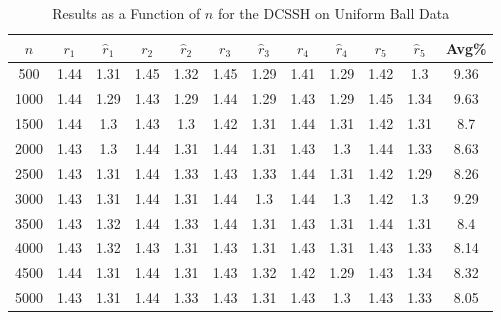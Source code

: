 \documentclass[11pt,twoside]{report}
\theoremstyle{definition}
\numberwithin{theorem}{section}
\numberwithin{definition}{section}
\numberwithin{lemma}{section}
\numberwithin{proposition}{section}
\numberwithin{equation}{section}
\numberwithin{figure}{section}
\begin{document}
\begin{appendices}
    \begin{table}[ht]
        \centering
        \begin{tabular}{|c||cc||cc||cc||cc||cc||c|} \hline
            $n$&$r_1$&$\hat{r}_1$&$r_2$&$\hat{r}_2$&$r_3$&$\hat{r}_3$&$r_4$&$\hat{r}_4$&$r_5$&$\hat{r}_5$&Avg\% \\ \hline
            500&1.44&1.31&1.45&1.32&1.45&1.29&1.41&1.29&1.42&1.3&9.36 \\
            1000&1.44&1.29&1.43&1.29&1.44&1.29&1.43&1.29&1.45&1.34&9.63 \\
            1500&1.44&1.3&1.43&1.3&1.42&1.31&1.44&1.31&1.42&1.31&8.7 \\
            2000&1.43&1.3&1.44&1.31&1.44&1.31&1.43&1.3&1.44&1.33&8.63 \\
            2500&1.43&1.31&1.44&1.33&1.43&1.33&1.44&1.31&1.42&1.29&8.26 \\
            3000&1.43&1.31&1.44&1.31&1.44&1.3&1.44&1.3&1.42&1.3&9.29 \\
            3500&1.43&1.32&1.44&1.33&1.44&1.31&1.43&1.31&1.44&1.31&8.4 \\
            4000&1.43&1.32&1.43&1.31&1.43&1.31&1.43&1.31&1.43&1.33&8.14 \\
            4500&1.44&1.31&1.44&1.31&1.43&1.32&1.42&1.29&1.43&1.34&8.32 \\
            5000&1.43&1.31&1.44&1.33&1.43&1.31&1.43&1.3&1.43&1.33&8.05 \\ \hline
        \end{tabular}
        \caption{Results as a Function of $n$ for the DCSSH on Uniform Ball Data}
        \label{tab:uniform_ball_dcssh_table_n}
    \end{table}
    

\end{appendices}
\end{document}
